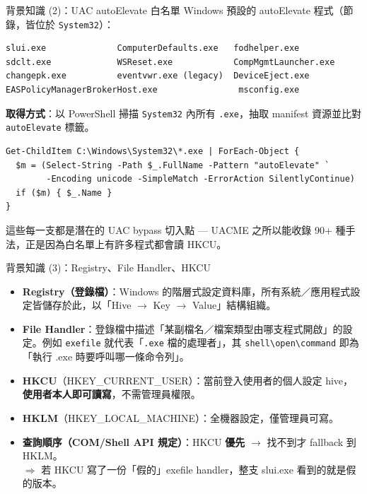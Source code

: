 \documentclass[12pt,aspectratio=169]{beamer}
\begin{document}
\begin{frame}[fragile]{背景知識 (2)：UAC autoElevate 白名單}
Windows 預設的 autoElevate 程式（節錄，皆位於 \texttt{System32}）：
\begin{lstlisting}[style=dark,basicstyle=\scriptsize\ttfamily\color{codefg}]
slui.exe              ComputerDefaults.exe   fodhelper.exe
sdclt.exe             WSReset.exe            CompMgmtLauncher.exe
changepk.exe          eventvwr.exe (legacy)  DeviceEject.exe
EASPolicyManagerBrokerHost.exe                msconfig.exe
\end{lstlisting}
\textbf{取得方式}：以 PowerShell 掃描 \texttt{System32} 內所有 \texttt{.exe}，抽取 manifest 資源並比對 \texttt{autoElevate} 標籤。
\begin{lstlisting}[style=dark,basicstyle=\scriptsize\ttfamily\color{codefg}]
Get-ChildItem C:\Windows\System32\*.exe | ForEach-Object {
  $m = (Select-String -Path $_.FullName -Pattern "autoElevate" `
        -Encoding unicode -SimpleMatch -ErrorAction SilentlyContinue)
  if ($m) { $_.Name }
}
\end{lstlisting}
這些每一支都是潛在的 UAC bypass 切入點 — UACME 之所以能收錄 90+ 種手法，正是因為白名單上有許多程式都會讀 HKCU。
\end{frame}

\begin{frame}{背景知識 (3)：Registry、File Handler、HKCU}
\begin{itemize}
  \item \textbf{Registry（登錄檔）}：Windows 的階層式設定資料庫，所有系統／應用程式設定皆儲存於此，以「Hive $\rightarrow$ Key $\rightarrow$ Value」結構組織。
  \item \textbf{File Handler}：登錄檔中描述「某副檔名／檔案類型由哪支程式開啟」的設定。例如 \texttt{exefile} 就代表「\texttt{.exe} 檔的處理者」，其 \texttt{shell\textbackslash open\textbackslash command} 即為「執行 .exe 時要呼叫哪一條命令列」。
  \item \textbf{HKCU}（HKEY\_CURRENT\_USER）：當前登入使用者的個人設定 hive，\textbf{使用者本人即可讀寫}，不需管理員權限。
  \item \textbf{HKLM}（HKEY\_LOCAL\_MACHINE）：全機器設定，僅管理員可寫。
  \item \textbf{查詢順序（COM/Shell API 規定）}：HKCU \textbf{優先} $\rightarrow$ 找不到才 fallback 到 HKLM。\\
  $\Rightarrow$ 若 HKCU 寫了一份「假的」exefile handler，整支 slui.exe 看到的就是假的版本。
\end{itemize}
\end{frame}
\end{document}

